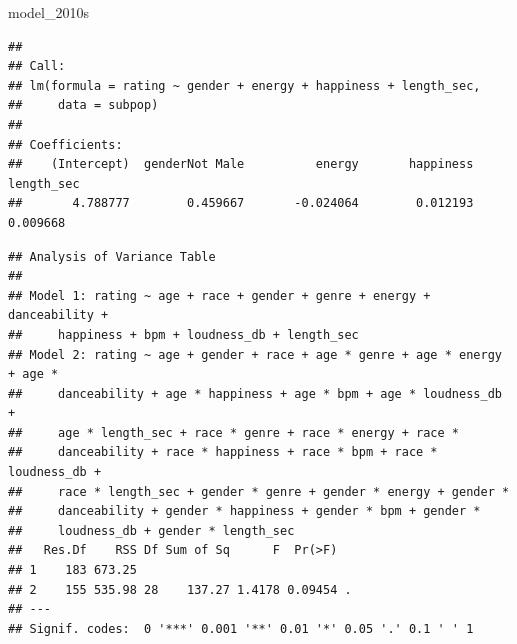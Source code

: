 \documentclass[
]{article}
\newenvironment{Shaded}{\begin{snugshade}}{\end{snugshade}}
\newcommand{\FunctionTok}[1]{\textcolor[rgb]{0.13,0.29,0.53}{\textbf{#1}}}
\newcommand{\NormalTok}[1]{#1}
\newcommand{\SpecialCharTok}[1]{\textcolor[rgb]{0.81,0.36,0.00}{\textbf{#1}}}
\newcommand{\StringTok}[1]{\textcolor[rgb]{0.31,0.60,0.02}{#1}}
\begin{document}
\begin{Shaded}
\begin{Highlighting}[]
\NormalTok{model\_2010s}
\end{Highlighting}
\end{Shaded}

\begin{verbatim}
## 
## Call:
## lm(formula = rating ~ gender + energy + happiness + length_sec, 
##     data = subpop)
## 
## Coefficients:
##    (Intercept)  genderNot Male          energy       happiness      length_sec  
##       4.788777        0.459667       -0.024064        0.012193        0.009668
\end{verbatim}

\begin{Shaded}
\end{Shaded}

\begin{verbatim}
## Analysis of Variance Table
## 
## Model 1: rating ~ age + race + gender + genre + energy + danceability + 
##     happiness + bpm + loudness_db + length_sec
## Model 2: rating ~ age + gender + race + age * genre + age * energy + age * 
##     danceability + age * happiness + age * bpm + age * loudness_db + 
##     age * length_sec + race * genre + race * energy + race * 
##     danceability + race * happiness + race * bpm + race * loudness_db + 
##     race * length_sec + gender * genre + gender * energy + gender * 
##     danceability + gender * happiness + gender * bpm + gender * 
##     loudness_db + gender * length_sec
##   Res.Df    RSS Df Sum of Sq      F  Pr(>F)  
## 1    183 673.25                              
## 2    155 535.98 28    137.27 1.4178 0.09454 .
## ---
## Signif. codes:  0 '***' 0.001 '**' 0.01 '*' 0.05 '.' 0.1 ' ' 1
\end{verbatim}

\begin{Shaded}
\end{Shaded}
\end{document}
